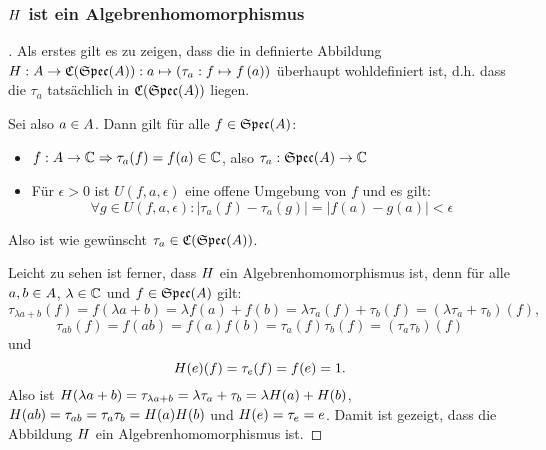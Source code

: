 \subsubsection{$H$ ist ein Algebrenhomomorphismus}\label{sec:Algebrenhomomorphismus}

\begin{proof}[]Als erstes gilt es zu zeigen, dass die in  definierte Abbildung $H: A \to \mathfrak{C}(\mathfrak{Spec}(A)): a \mapsto \left(\tau_a: f \mapsto f\left(a\right)\right)$ überhaupt wohldefiniert ist, d.h. dass die $\tau_a$ tatsächlich in $\mathfrak{C}(\mathfrak{Spec}(A))$ liegen.

Sei also $a \in A$. Dann gilt für alle $f \in \mathfrak{Spec}(A)$:
\begin{itemize}
	\item $f: A \to \mathbb{C} \Rightarrow \tau_a(f) = f(a) \in \mathbb{C}$, also $\tau_a: \mathfrak{Spec}(A) \to \mathbb{C}$
	\item Für $\epsilon > 0$ ist $U(f, a, \epsilon)$ eine offene Umgebung von $f$ und es gilt:
		\[\forall g \in U(f, a, \epsilon): |\tau_a(f) - \tau_a(g)| = |f(a) - g(a)| < \epsilon\]
\end{itemize}
Also ist wie gewünscht $\tau_a \in \mathfrak{C}(\mathfrak{Spec}(A))$.

Leicht zu sehen ist ferner, dass $H$ ein Algebrenhomomorphismus ist, denn für alle $a, b \in A$, $\lambda \in \mathbb{C}$ und $f \in \mathfrak{Spec}(A)$ gilt:
	\[\tau_{\lambda a + b}(f) = f(\lambda a + b) = \lambda f(a) + f(b) = \lambda \tau_a(f) + \tau_b(f) = \left(\lambda \tau_a + \tau_b\right)(f),\]
	\[\tau_{ab}(f) = f(ab) = f(a)f(b) = \tau_a(f)\tau_b(f) = (\tau_a\tau_b)(f)\]
und
	\[H(e)(f) = \tau_e(f) = f(e) = 1.\]
Also ist $H(\lambda a + b) = \tau_{\lambda a + b} = \lambda \tau_a + \tau_b = \lambda H(a) + H(b)$, $H(ab) = \tau_{ab} = \tau_a\tau_b = H(a)H(b)$ und $H(e) = \tau_e = e$. Damit ist gezeigt, dass die Abbildung $H$ ein Algebrenhomomorphismus ist.

\let\qed\relax
\end{proof}